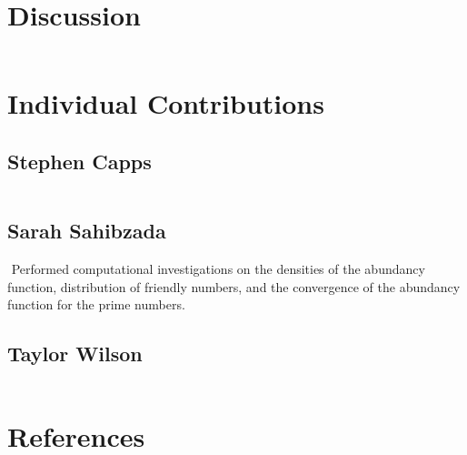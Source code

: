\documentclass[11pt]{article}
\theoremstyle{definition}
\begin{document}
\section{Discussion}$ $

\indent  
\section{Individual Contributions}
\subsection{Stephen Capps}$ $
\indent   
\subsection{Sarah Sahibzada}$ $
\indent Performed computational investigations on the densities of the abundancy function, distribution of friendly numbers, and the convergence of the abundancy function for the prime numbers. 
\subsection{Taylor Wilson}$ $
\indent 

\newpage
\section{References}
\end{document}
